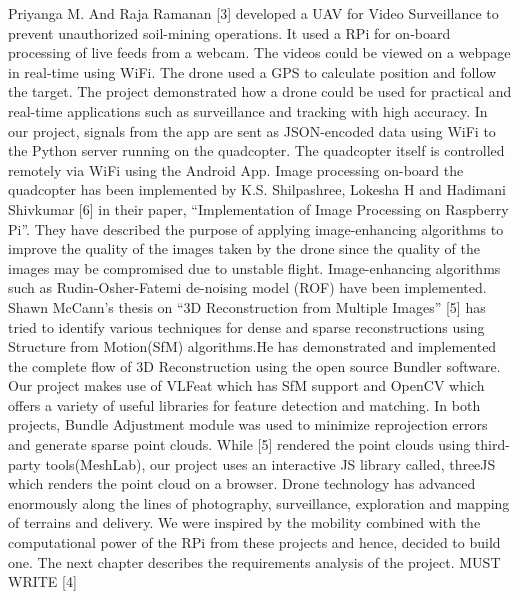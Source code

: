 \newline
\newline
 Priyanga M. And Raja Ramanan [3] developed a UAV for Video Surveillance to prevent unauthorized soil-mining operations. It used a RPi for on-board processing of live feeds from a webcam. The videos could be viewed on a webpage in real-time using WiFi. The drone used a GPS to calculate position and follow the target. The project demonstrated how a drone could be used for practical and real-time applications such as surveillance and tracking with high accuracy. 
\newline
 In our project, signals from the app are sent as JSON-encoded data using WiFi to the Python server running on the quadcopter. The quadcopter itself is controlled remotely via WiFi using the Android App.
 \newline
 \newline
Image processing on-board the quadcopter has been implemented by K.S. Shilpashree, Lokesha H and Hadimani Shivkumar [6] in their paper, “Implementation of Image Processing on Raspberry Pi”. They have described the purpose of applying image-enhancing algorithms to improve the quality of the images taken by the drone since the quality of the images may be compromised due to unstable flight. Image-enhancing algorithms such as Rudin-Osher-Fatemi de-noising model (ROF) have been implemented. 
\newline
\newline
Shawn McCann's thesis on “3D Reconstruction from Multiple Images” [5] has tried to identify various techniques for dense and sparse reconstructions using Structure from Motion(SfM) algorithms.He has demonstrated and implemented the complete flow of 3D Reconstruction using the open source Bundler software. Our project makes use of VLFeat which has SfM support and OpenCV which offers a variety of useful libraries for feature detection and matching. 
\newline
In both projects, Bundle Adjustment module was used to minimize reprojection errors and generate sparse point clouds. While [5] rendered the point clouds using third-party tools(MeshLab), our project uses an interactive JS library called, threeJS which renders the point cloud on a browser.
\newline
\newline
Drone technology has advanced enormously along the lines of photography, surveillance, exploration and mapping of terrains and delivery. We were inspired by the mobility combined with the computational power of the RPi from these projects and hence, decided to build one.
\newline
The next chapter describes the requirements analysis of the project.
MUST WRITE [4]

